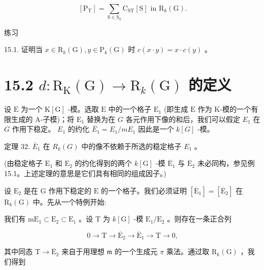 \documentclass[10pt]{article}
\begin{document}
\[
\left\lbrack  {\mathrm{P}}_{\mathrm{T}}\right\rbrack   = \mathop{\sum }\limits_{{\mathrm{S} \in  {\mathrm{S}}_{k}}}{\mathrm{C}}_{\mathrm{{ST}}}\left\lbrack  \mathrm{S}\right\rbrack  \text{ in }{\mathrm{R}}_{k}\left( \mathrm{G}\right) .
\]

练习

15.1. 证明当 \(x \in  {\mathrm{R}}_{k}\left( \mathrm{G}\right) ,y \in  {\mathrm{P}}_{k}\left( \mathrm{G}\right)\) 时 \(c\left( {x \cdot  y}\right)  = x \cdot  c\left( y\right)\) 。

\section*{15.2 \(d : {\mathrm{R}}_{\mathrm{K}}\left( \mathrm{G}\right)  \rightarrow  {\mathrm{R}}_{k}\left( \mathrm{G}\right)\) 的定义}

设 \(\mathrm{E}\) 为一个 \(\mathrm{K}\left\lbrack  \mathrm{G}\right\rbrack\) -模。选取 \(\mathrm{E}\) 中的一个格子 \({\mathrm{E}}_{1}\) (即生成 \(\mathrm{E}\) 作为 K-模的一个有限生成的 A-子模)；将 \({\mathrm{E}}_{1}\) 替换为在 \(G\) 各元作用下像的和后，我们可以假定 \({E}_{1}\) 在 \(G\) 作用下稳定。 \({E}_{1}\) 的约化 \({\bar{E}}_{1} = {E}_{1}/m{E}_{1}\) 因此是一个 \(k\left\lbrack  G\right\rbrack\) -模。

定理 32. \({\bar{E}}_{1}\) 在 \({R}_{k}\left( G\right)\) 中的像不依赖于所选的稳定格子 \({E}_{1}\) 。

(由稳定格子 \({\mathrm{E}}_{1}\) 和 \({\mathrm{E}}_{2}\) 的约化得到的两个 \(k\left\lbrack  \mathrm{G}\right\rbrack\) -模 \({\overline{\mathrm{E}}}_{1}\) 与 \({\overline{\mathrm{E}}}_{2}\) 未必同构，参见例 15.1。上述定理的意思是它们具有相同的组成因子。)

设 \({\mathrm{E}}_{2}\) 是在 \(\mathrm{G}\) 作用下稳定的 \(\mathrm{E}\) 的一个格子。我们必须证明 \(\left\lbrack  {\overline{\mathrm{E}}}_{1}\right\rbrack   = \left\lbrack  {\overline{\mathrm{E}}}_{2}\right\rbrack\) 在 \({\mathrm{R}}_{k}\left( \mathrm{G}\right)\) 中。先从一个特例开始:

我们有 \({\mathrm{{mE}}}_{1} \subset  {\mathrm{E}}_{2} \subset  {\mathrm{E}}_{1}\) 。设 \(\mathrm{T}\) 为 \(k\left\lbrack  \mathrm{G}\right\rbrack\) -模 \({\mathrm{E}}_{1}/{\mathrm{E}}_{2}\) 。则存在一条正合列

\[
0 \rightarrow  \mathrm{T} \rightarrow  {\overline{\mathrm{E}}}_{2} \rightarrow  {\overline{\mathrm{E}}}_{1} \rightarrow  \mathrm{T} \rightarrow  0,
\]

其中同态 \(\mathrm{T} \rightarrow  {\overline{\mathrm{E}}}_{2}\) 来自于用理想 \(\mathfrak{m}\) 的一个生成元 \(\pi\) 乘法。通过取 \({\mathrm{R}}_{k}\left( \mathrm{G}\right)\) ，我们得到
\end{document}
